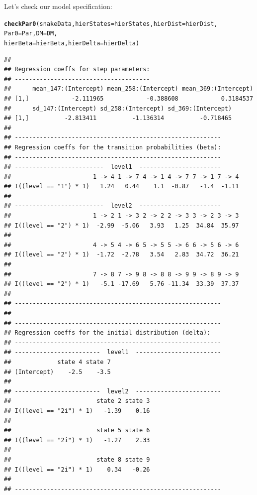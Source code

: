 \documentclass[12pt]{article}\usepackage[]{graphicx}\usepackage[]{xcolor}
\makeatletter
\newcommand{\hldef}[1]{\textcolor[rgb]{0.345,0.345,0.345}{#1}}%
\newcommand{\hlkwc}[1]{\textcolor[rgb]{0.333,0.667,0.333}{#1}}%
\newcommand{\hlkwd}[1]{\textcolor[rgb]{0.737,0.353,0.396}{\textbf{#1}}}%
\newenvironment{kframe}{%
 \def\at@end@of@kframe{}%
 \ifinner\ifhmode%
  \def\at@end@of@kframe{\end{minipage}}%
  \begin{minipage}{\columnwidth}%
 \fi\fi%
 \def\FrameCommand##1{\hskip\@totalleftmargin \hskip-\fboxsep
 \colorbox{shadecolor}{##1}\hskip-\fboxsep
     \hskip-\linewidth \hskip-\@totalleftmargin \hskip\columnwidth}%
 \MakeFramed {\advance\hsize-\width
   \@totalleftmargin\z@ \linewidth\hsize
   \@setminipage}}%
 {\par\unskip\endMakeFramed%
 \at@end@of@kframe}
\newenvironment{knitrout}{}{} %
\makeatother
\begin{document}
Let's check our model specification:
\begin{knitrout}
\color{fgcolor}\begin{kframe}
\begin{alltt}
\hlkwd{checkPar0}\hldef{(snakeData,}\hlkwc{hierStates}\hldef{=hierStates,}\hlkwc{hierDist}\hldef{=hierDist,}
          \hlkwc{Par0}\hldef{=Par,}\hlkwc{DM}\hldef{=DM,}
          \hlkwc{hierBeta}\hldef{=hierBeta,}\hlkwc{hierDelta}\hldef{=hierDelta)}
\end{alltt}
\begin{verbatim}
## 
## Regression coeffs for step parameters:
## --------------------------------------
##      mean_147:(Intercept) mean_258:(Intercept) mean_369:(Intercept)
## [1,]            -2.111965            -0.388608            0.3184537
##      sd_147:(Intercept) sd_258:(Intercept) sd_369:(Intercept)
## [1,]          -2.813411          -1.136314          -0.718465
## 
## ----------------------------------------------------------
## Regression coeffs for the transition probabilities (beta):
## ----------------------------------------------------------
## -------------------------  level1  -----------------------
##                       1 -> 4 1 -> 7 4 -> 1 4 -> 7 7 -> 1 7 -> 4
## I((level == "1") * 1)   1.24   0.44    1.1  -0.87   -1.4  -1.11
## 
## -------------------------  level2  -----------------------
##                       1 -> 2 1 -> 3 2 -> 2 2 -> 3 3 -> 2 3 -> 3
## I((level == "2") * 1)  -2.99  -5.06   3.93   1.25  34.84  35.97
## 
##                       4 -> 5 4 -> 6 5 -> 5 5 -> 6 6 -> 5 6 -> 6
## I((level == "2") * 1)  -1.72  -2.78   3.54   2.83  34.72  36.21
## 
##                       7 -> 8 7 -> 9 8 -> 8 8 -> 9 9 -> 8 9 -> 9
## I((level == "2") * 1)   -5.1 -17.69   5.76 -11.34  33.39  37.37
## 
## ----------------------------------------------------------
## 
## ----------------------------------------------------------
## Regression coeffs for the initial distribution (delta):
## ----------------------------------------------------------
## ------------------------  level1  ------------------------
##             state 4 state 7
## (Intercept)    -2.5    -3.5
## 
## ------------------------  level2  ------------------------
##                        state 2 state 3
## I((level == "2i") * 1)   -1.39    0.16
## 
##                        state 5 state 6
## I((level == "2i") * 1)   -1.27    2.33
## 
##                        state 8 state 9
## I((level == "2i") * 1)    0.34   -0.26
## 
## ----------------------------------------------------------
\end{verbatim}
\end{kframe}
\end{knitrout}
\end{document}
